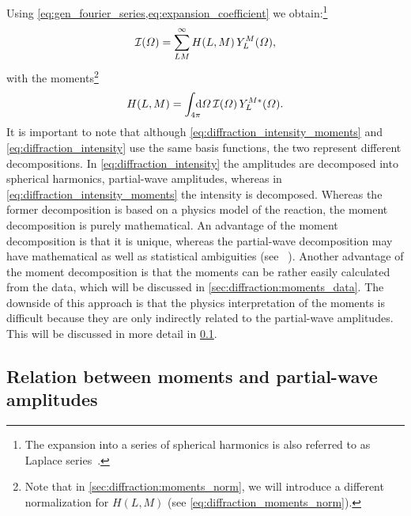 Using \cref{eq:gen_fourier_series,eq:expansion_coefficient} we
obtain:\footnote{The expansion into a series of spherical harmonics is
also referred to as Laplace series~\cite{MathWorld:LaplaceSeries}.}
\begin{equation}
  \label{eq:diffraction_intensity_moments}
  \mathcal{I}(\Omega)
  = \sum_{L M}^\infty H(L, M)\, Y_L^M(\Omega),
\end{equation}
with the moments\footnote{Note that in
\cref{sec:diffraction:moments_norm}, we will introduce a different
normalization for $H(L, M)$ (see \cref{eq:diffraction_moments_norm}).}
\begin{equation}
  \label{eq:diffraction_moments}
  H(L, M)
  = \int_{4 \pi}\!\!\!\! \dif{\Omega}\, \intensity(\Omega)\, Y_L^{M *}(\Omega).
\end{equation}
It is important to note that although
\cref{eq:diffraction_intensity_moments} and
\cref{eq:diffraction_intensity} use the same basis functions, the two
represent different decompositions.  In
\cref{eq:diffraction_intensity} the amplitudes are decomposed into
spherical harmonics, \ie partial-wave amplitudes, whereas in
\cref{eq:diffraction_intensity_moments} the intensity is decomposed.
Whereas the former decomposition is based on a physics model of the
reaction, the moment decomposition is purely mathematical.  An
advantage of the moment decomposition is that it is unique, whereas
the partial-wave decomposition may have mathematical as well as
statistical ambiguities (see \eg\ ).  Another
advantage of the moment decomposition is that the moments can be
rather easily calculated from the data, which will be discussed in
\cref{sec:diffraction:moments_data}.  The downside of this approach is
that the physics interpretation of the moments is difficult because
they are only indirectly related to the partial-wave amplitudes.  This
will be discussed in more detail in \cref{sec:diffraction:moments_pw}.


\subsection{Relation between moments and partial-wave amplitudes}%
\label{sec:diffraction:moments_pw}

